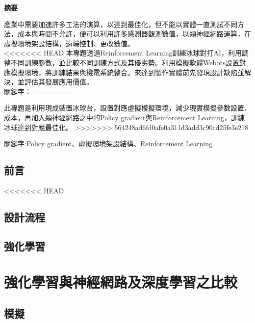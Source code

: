 \documentclass[14pt,a4paper]{article}
\begin{document}
\begin{center}

\LARGE\textbf{摘要}\\
\begin{LARGE}
\begin{flushleft}
\hspace{12pt} 產業中需要加速許多工法的演算，以達到最佳化，但不能以實體一直測試不同方法，成本與時間不允許，便可以利用許多感測器觀測數值，以類神經網路運算，在虛擬環境架設結構，遠端控制、更改數值。\\
<<<<<<< HEAD
 \hspace{12pt} 本專題透過Reinforcement Learning訓練冰球對打AI，利用調整不同訓練參數，並比較不同訓練方式及其優劣勢。利用模擬軟體Webots設置對應模擬環境，將訓練結果與機電系統整合。來達到製作實體前先發現設計缺陷並解決，並評估其發展應用價值。\\[12 pt]
關鍵字：
=======

 \hspace{12pt} 此專題是利用現成裝置冰球台，設置對應虛擬模擬環境，減少現實模擬參數設置、成本，再加入類神經網路之中的Policy gradient與Reinforcement Learning，訓練冰球達到對應最佳化。
>>>>>>> 564248ad6fd0afe0a311d3add3c90cd25fe3e278
\end{flushleft}
\begin{center}
關鍵字:Policy gradient、虛擬環境架設結構、Reinforcement Learning
\end{center}
\end{LARGE}
\newpage
\renewcommand{\contentsname}{\centerline{\fontsize{18pt}{\baselineskip}\selectfont\textbf{目\quad 錄}}}
\tableofcontents
\newpage
\renewcommand{\listfigurename}{\centerline{\fontsize{18pt}{\baselineskip}\selectfont\textbf{圖\quad 表\quad 目\quad 錄 }}}
\listoffigures
\newpage
\end{center}
\newpage
\section{前言}
\setcounter{page}{1}
\newpage
<<<<<<< HEAD
\section{設計流程}
\newpage
\section{強化學習}
\chapter{強化學習與神經網路及深度學習之比較}
\newpage
\section{模擬}
\end{document}
